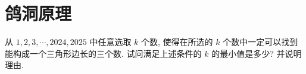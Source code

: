 \section{鸽洞原理}
从 $1, 2, 3, \cdots, 2024, 2025$ 中任意选取 $k$ 个数, 使得在所选的 $k$ 个数中一定可以找到能构成一个三角形边长的三个数. 
试问满足上述条件的 $k$ 的最小值是多少? 并说明理由.
\eq

